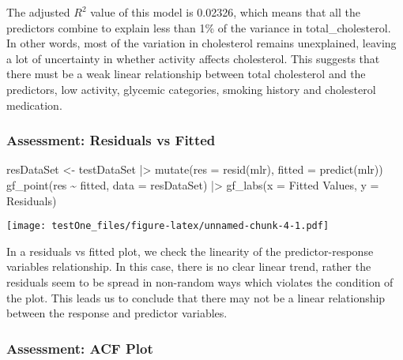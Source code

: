 \documentclass[
]{article}
\newenvironment{Shaded}{\begin{snugshade}}{\end{snugshade}}
\newcommand{\AttributeTok}[1]{\textcolor[rgb]{0.77,0.63,0.00}{#1}}
\newcommand{\FunctionTok}[1]{\textcolor[rgb]{0.00,0.00,0.00}{#1}}
\newcommand{\NormalTok}[1]{#1}
\newcommand{\OtherTok}[1]{\textcolor[rgb]{0.56,0.35,0.01}{#1}}
\newcommand{\SpecialCharTok}[1]{\textcolor[rgb]{0.00,0.00,0.00}{#1}}
\newcommand{\StringTok}[1]{\textcolor[rgb]{0.31,0.60,0.02}{#1}}
\begin{document}
The adjusted \(R^2\) value of this model is 0.02326, which means that
all the predictors combine to explain less than 1\% of the variance in
total\_cholesterol. In other words, most of the variation in cholesterol
remains unexplained, leaving a lot of uncertainty in whether activity
affects cholesterol. This suggests that there must be a weak linear
relationship between total cholesterol and the predictors, low activity,
glycemic categories, smoking history and cholesterol medication.

\hypertarget{assessment-residuals-vs-fitted}{%
\subsubsection{Assessment: Residuals vs
Fitted}\label{assessment-residuals-vs-fitted}}

\begin{Shaded}
\begin{Highlighting}[]
\NormalTok{resDataSet }\OtherTok{\textless{}{-}}\NormalTok{ testDataSet }\SpecialCharTok{|\textgreater{}}
\FunctionTok{mutate}\NormalTok{(}\AttributeTok{res =} \FunctionTok{resid}\NormalTok{(mlr),}
\AttributeTok{fitted =} \FunctionTok{predict}\NormalTok{(mlr))}
\FunctionTok{gf\_point}\NormalTok{(res }\SpecialCharTok{\textasciitilde{}}\NormalTok{ fitted, }\AttributeTok{data =}\NormalTok{ resDataSet) }\SpecialCharTok{|\textgreater{}}
\FunctionTok{gf\_labs}\NormalTok{(}\AttributeTok{x =} \StringTok{\textquotesingle{}Fitted Values\textquotesingle{}}\NormalTok{, }\AttributeTok{y =} \StringTok{\textquotesingle{}Residuals\textquotesingle{}}\NormalTok{)}
\end{Highlighting}
\end{Shaded}

\texttt{[image: testOne\_files/figure-latex/unnamed-chunk-4-1.pdf]}

In a residuals vs fitted plot, we check the linearity of the
predictor-response variables relationship. In this case, there is no
clear linear trend, rather the residuals seem to be spread in non-random
ways which violates the condition of the plot. This leads us to conclude
that there may not be a linear relationship between the response and
predictor variables.

\hypertarget{assessment-acf-plot}{%
\subsubsection{Assessment: ACF Plot}\label{assessment-acf-plot}}
\end{document}
